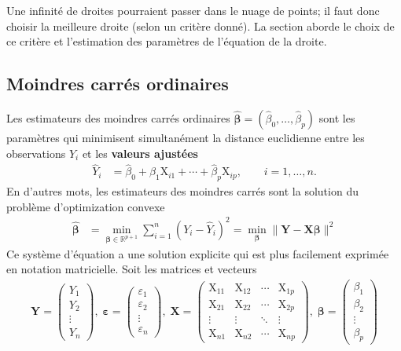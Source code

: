 \documentclass[
  11pt,
  letterpaper,
]{article}
\theoremstyle{definition}
\theoremstyle{definition}
\theoremstyle{definition}
\theoremstyle{remark}
\begin{document}
Une infinité de droites pourraient passer dans le nuage de points; il faut donc choisir la meilleure droite (selon un critère donné). La section aborde le choix de ce critère et l'estimation des paramètres de l'équation de la droite.

\hypertarget{moindres-carruxe9s-ordinaires}{%
\subsection{Moindres carrés ordinaires}\label{moindres-carruxe9s-ordinaires}}

Les estimateurs des moindres carrés ordinaires \(\widehat{\boldsymbol{\beta}}=(\widehat{\beta}_0, \ldots, \widehat{\beta}_p)\) sont les paramètres qui minimisent simultanément la distance euclidienne entre les observations \(Y_i\) et les \textbf{valeurs ajustées}
\begin{align*}
 \widehat{Y}_i &= \widehat{\beta}_0 + \widehat{\beta}_1 \mathrm{X}_{i1} + \cdots + \widehat{\beta}_p \mathrm{X}_{ip}, \qquad i =1, \ldots, n.
\end{align*}
En d'autres mots, les estimateurs des moindres carrés sont la solution du problème d'optimization convexe
\begin{align*}
\widehat{\boldsymbol{\beta}} &=\min_{\boldsymbol{\beta} \in \mathbb{R}^{p+1}}\sum_{i=1}^n (Y_i-\widehat{Y}_i)^2= \min_{\boldsymbol{\beta}} \|\boldsymbol{Y}-\mathbf{X}\boldsymbol{\beta}\|^2
\end{align*}
Ce système d'équation a une solution explicite qui est plus facilement exprimée en notation matricielle. Soit les matrices et vecteurs
\begin{align*}
\boldsymbol{Y} =
 \begin{pmatrix}
  Y_1 \\
  Y_2 \\
  \vdots \\
  Y_n 
 \end{pmatrix} ,
 \;
 \boldsymbol{\varepsilon} =
 \begin{pmatrix}
  \varepsilon_1 \\
  \varepsilon_2 \\
  \vdots \\
  \varepsilon_n 
 \end{pmatrix} ,
 \;
\mathbf{X} = \begin{pmatrix}
\mathrm{X}_{11} & \mathrm{X}_{12} & \cdots & \mathrm{X}_{1p} \\
\mathrm{X}_{21} & \mathrm{X}_{22} & \cdots & \mathrm{X}_{2p} \\
\vdots & \vdots & \ddots & \vdots \\
\mathrm{X}_{n1} & \mathrm{X}_{n2} & \cdots & \mathrm{X}_{np} 
\end{pmatrix} , \;
\boldsymbol{\beta} =
 \begin{pmatrix}
  \beta_1 \\
  \beta_2 \\
  \vdots \\
  \beta_p 
 \end{pmatrix}
\end{align*}
\end{document}
